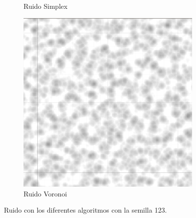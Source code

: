 \begin{itemize}
\begin{figure}[ht]
\begin{subfigure}{0.3\linewidth}
            \caption{Ruido Simplex}
        \end{subfigure}
        \hfill
        \begin{subfigure}{0.3\linewidth}
            \centering
            \includegraphics[width=\linewidth]{img/codes/Voronoi123.png}
            \caption{Ruido Voronoi}
        \end{subfigure}
        \caption{Ruido con los diferentes algoritmos con la semilla 123.}
    \end{figure}


\end{itemize}

